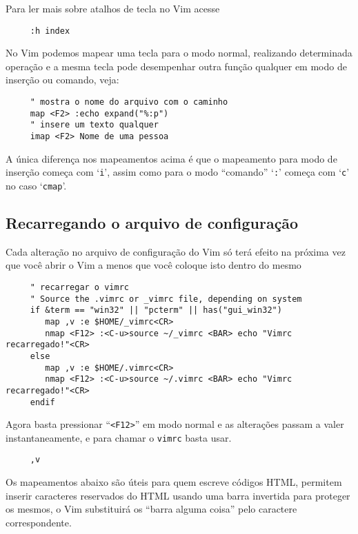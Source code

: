 Para ler mais sobre atalhos de tecla no Vim acesse 

\begin{verbatim}
     :h index
\end{verbatim}

No Vim podemos mapear uma tecla para o modo normal, realizando
determinada operação e a mesma tecla pode desempenhar outra função
qualquer em modo de inserção ou comando, veja:

\begin{verbatim}
     " mostra o nome do arquivo com o caminho
     map <F2> :echo expand("%:p")
     " insere um texto qualquer
     imap <F2> Nome de uma pessoa
\end{verbatim}

A única diferença nos mapeamentos acima é que o mapeamento para modo de
inserção começa com `{\tt i}', assim como para o modo ``comando'' `{\tt :}'
começa com `{\tt c}' no caso `{\tt cmap}'.

\subsection{Recarregando o arquivo de configuração}
\label{sec:Recarregando o arquivo de configuração}

Cada alteração no arquivo de configuração do Vim só terá efeito na próxima vez que você
abrir o Vim a menos que você coloque isto dentro do mesmo

\begin{verbatim}
     " recarregar o vimrc
     " Source the .vimrc or _vimrc file, depending on system
     if &term == "win32" || "pcterm" || has("gui_win32")
        map ,v :e $HOME/_vimrc<CR>
        nmap <F12> :<C-u>source ~/_vimrc <BAR> echo "Vimrc recarregado!"<CR>
     else
        map ,v :e $HOME/.vimrc<CR>
        nmap <F12> :<C-u>source ~/.vimrc <BAR> echo "Vimrc recarregado!"<CR>
     endif
\end{verbatim}

Agora basta pressionar ``\verb|<F12>|'' em modo normal e as alterações passam a valer
instantaneamente, e para chamar o {\tt vimrc} basta usar.

\begin{verbatim}
     ,v
\end{verbatim}

Os mapeamentos abaixo são úteis para quem escreve códigos HTML, permitem
inserir caracteres reservados do HTML usando uma barra invertida para proteger
os mesmos, o Vim substituirá os ``barra alguma coisa'' pelo caractere
correspondente.

